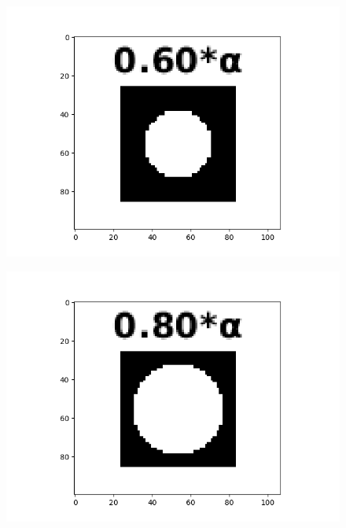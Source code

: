 \documentclass[12pt, a4paper]{article}
\begin{document}
\begin{figure}[h!]
\begin{minipage}[c][1\width]{0.19\textwidth}
	    \label{fig:3.4(a)}
    \end{minipage}
\renewcommand{\thefigure}{: flower}
    \begin{minipage}[c][1\width]{0.19\textwidth}
        \hspace*{-14pt}
    	\includegraphics[width=1.24\textwidth]{flower_kernel_0.60_cropped.png}
	    \label{fig:3.4(a)}
	    \vspace*{-23pt}
	    \caption{}
    \end{minipage}
    \begin{minipage}[c][1\width]{0.19\textwidth}
        \hspace*{-14pt}
    	\includegraphics[width=1.24\textwidth]{flower_kernel_0.80_cropped.png}

\end{minipage}
\end{figure}
\end{document}
